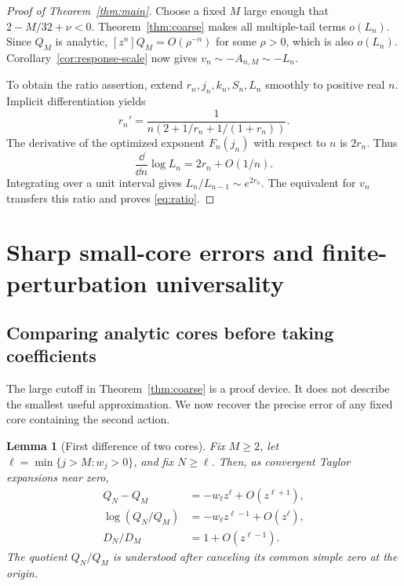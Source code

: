 \documentclass[11pt,a4paper]{article}
\numberwithin{equation}{section}
\newtheorem{lemma}[theorem]{Lemma}
\theoremstyle{definition}
\theoremstyle{remark}
\begin{document}
\begin{proof}[Proof of Theorem~\ref{thm:main}]
Choose a fixed $M$ large enough that $2-M/32+\nu<0$.
Theorem~\ref{thm:coarse} makes all multiple-tail terms $o(L_n)$.
Since $Q_M$ is analytic, $[z^n]Q_M=O(\rho^{-n})$ for some $\rho>0$,
which is also $o(L_n)$. Corollary~\ref{cor:response-scale} now gives
$v_n\sim-A_{n,M}\sim-L_n$.

To obtain the ratio assertion, extend $r_n,j_n,k_n,S_n,L_n$ smoothly to
positive real $n$. Implicit differentiation yields
\begin{equation}
 r_n'=\frac1{n(2+1/r_n+1/(1+r_n))}.
 \label{eq:rprime}
\end{equation}
The derivative of the optimized exponent $F_n(j_n)$ with respect to $n$
is $2r_n$. Thus
\[
 \frac{\dd}{\dd n}\log L_n=2r_n+O(1/n).
\]
Integrating over a unit interval gives $L_n/L_{n-1}\sim e^{2r_n}$.
The equivalent for $v_n$ transfers this ratio and proves
\eqref{eq:ratio}.
\end{proof}
\section{Sharp small-core errors and finite-perturbation universality}
\label{sec:sharp}

\subsection{Comparing analytic cores before taking coefficients}

The large cutoff in Theorem~\ref{thm:coarse} is a proof device. It does
not describe the smallest useful approximation. We now recover the precise
error of any fixed core containing the second action.

\begin{lemma}[First difference of two cores]
\label{lem:core-difference}
Fix $M\ge2$, let $\ell=\min\{j>M:w_j>0\}$, and fix $N\ge\ell$.
Then, as convergent Taylor expansions near zero,
\begin{align}
 Q_N-Q_M&=-w_\ell z^\ell+O(z^{\ell+1}),\label{eq:core-difference}\\
 \log(Q_N/Q_M)&=-w_\ell z^{\ell-1}+O(z^\ell),\label{eq:log-core-difference}\\
 D_N/D_M&=1+O(z^{\ell-1}).\label{eq:Ddifference}
\end{align}
The quotient $Q_N/Q_M$ is understood after canceling its common simple
zero at the origin.
\end{lemma}
\end{document}
